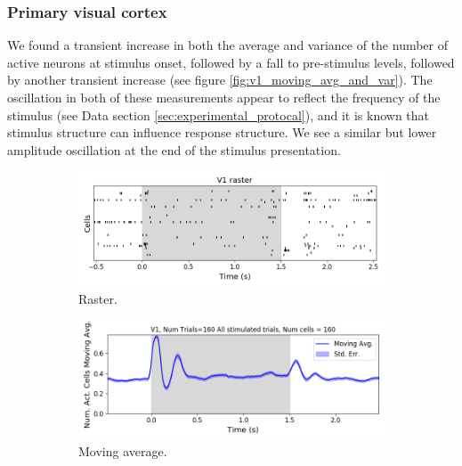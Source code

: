     \subsubsection{Primary visual cortex}
    We found a transient increase in both the average and variance of the number of active neurons at stimulus onset, followed by a fall to pre-stimulus levels, followed by another transient increase (see figure \ref{fig:v1_moving_avg_and_var}). The oscillation in both of these measurements appear to reflect the frequency of the stimulus (see Data section \ref{sec:experimental_protocal}), and it is known that stimulus structure can influence response structure\parencite{litwinkumar}. We see a similar but lower amplitude oscillation at the end of the stimulus presentation.

    \begin{figure}[p]
      \begin{subfigure}[h]{\linewidth}
        \includegraphics[width=\linewidth]{figures/conway_maxwell/v1_raster_16.png}
        \caption{Raster.}
        \label{fig:v1_raster}
      \end{subfigure}
      \begin{subfigure}[h]{\linewidth}
        \includegraphics[width=\linewidth]{figures/conway_maxwell/v1_1ms_moving_avg_all_stimulated_trials.png}
        \caption{Moving average.}
        \label{fig:v1_moving_avg_num_active_cells}
      \end{subfigure}
      \begin{subfigure}[h]{\linewidth}

\end{subfigure}
\end{figure}
